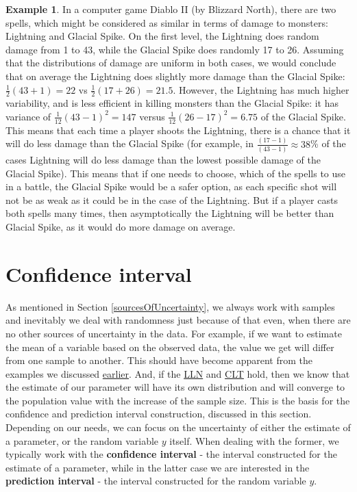 \documentclass[
]{book}
\theoremstyle{definition}
\theoremstyle{definition}
\newtheorem{example}{Example}[chapter]
\theoremstyle{definition}
\theoremstyle{definition}
\theoremstyle{remark}
\begin{document}
\begin{example}
In a computer game Diablo II (by Blizzard North), there are two spells, which might be considered as similar in terms of damage to monsters: Lightning and Glacial Spike. On the first level, the Lightning does random damage from 1 to 43, while the Glacial Spike does randomly 17 to 26. Assuming that the distributions of damage are uniform in both cases, we would conclude that on average the Lightning does slightly more damage than the Glacial Spike: \(\frac{1}{2}(43+1)=22\) vs \(\frac{1}{2}(17+26)=21.5\). However, the Lightning has much higher variability, and is less efficient in killing monsters than the Glacial Spike: it has variance of \(\frac{1}{12}(43-1)^2 = 147\) versus \(\frac{1}{12}(26-17)^2 = 6.75\) of the Glacial Spike. This means that each time a player shoots the Lightning, there is a chance that it will do less damage than the Glacial Spike (for example, in \(\frac{(17-1)}{(43-1)} \approx 38\)\% of the cases Lightning will do less damage than the lowest possible damage of the Glacial Spike). This means that if one needs to choose, which of the spells to use in a battle, the Glacial Spike would be a safer option, as each specific shot will not be as weak as it could be in the case of the Lightning. But if a player casts both spells many times, then asymptotically the Lightning will be better than Glacial Spike, as it would do more damage on average.
\end{example}

\section{Confidence interval}\label{confidenceInterval}

As mentioned in Section \ref{sourcesOfUncertainty}, we always work with samples and inevitably we deal with randomness just because of that even, when there are no other sources of uncertainty in the data. For example, if we want to estimate the mean of a variable based on the observed data, the value we get will differ from one sample to another. This should have become apparent from the examples we discussed \hyperref[estimatesProperties]{earlier}. And, if the \hyperref[LLN]{LLN} and \hyperref[CLT]{CLT} hold, then we know that the estimate of our parameter will have its own distribution and will converge to the population value with the increase of the sample size. This is the basis for the confidence and prediction interval construction, discussed in this section. Depending on our needs, we can focus on the uncertainty of either the estimate of a parameter, or the random variable \(y\) itself. When dealing with the former, we typically work with the \textbf{confidence interval} - the interval constructed for the estimate of a parameter, while in the latter case we are interested in the \textbf{prediction interval} - the interval constructed for the random variable \(y\).
\end{document}
